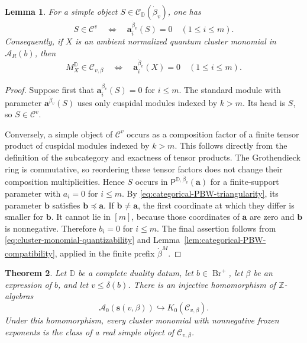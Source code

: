 \documentclass[12pt, reqno]{amsart}
\theoremstyle{plain}
\newtheorem{theorem}{Theorem}[section]
\newtheorem{lemma}[theorem]{Lemma}
\theoremstyle{definition}
\numberwithin{equation}{section}
\newcommand{\ZZ}{\mathbb{Z}}
\newcommand{\DD}{\mathbb{D}}
\newcommand{\bfa}{\mathbf{a}}
\newcommand{\cA}{\mathcal{A}}
\newcommand{\Br}{{\operatorname{Br}}}
\begin{document}
\begin{lemma}\label{lem:categorical-prefix-vanishing}
For a simple object \(S\in\mathscr C_{\DD}(\dot\beta_v)\), one has
\[
S\in\mathscr C^v
\quad\Longleftrightarrow\quad
\bfa^{\dot\beta_v}_i(S)=0\quad(1\le i\le m).
\]
Consequently, if \(X\) is an ambient normalized quantum cluster
monomial in \(\widehat{\cA}_R(b)\), then
\[
M_X^{\DD}\in\mathscr C_{v,\beta}
\quad\Longleftrightarrow\quad
\bfa^{\dot\beta_v}_i(X)=0\quad(1\le i\le m).
\]
\end{lemma}

\begin{proof}
Suppose first that \(\bfa^{\dot\beta_v}_i(S)=0\) for \(i\le m\).
The standard module with parameter \(\bfa^{\dot\beta_v}(S)\) uses
only cuspidal modules indexed by \(k>m\). Its head is \(S\), so
\(S\in\mathscr C^v\).

Conversely, a simple object of \(\mathscr C^v\) occurs as a
composition factor of a finite tensor product of cuspidal modules
indexed by \(k>m\). This follows directly from the definition of the
subcategory and exactness of tensor products. The Grothendieck ring
is commutative, so reordering these tensor factors does not change
their composition multiplicities. Hence \(S\) occurs in
\(\mathsf P^{\DD,\dot\beta_v}(\mathbf a)\) for a finite-support
parameter with \(a_i=0\) for \(i\le m\). By
\eqref{eq:categorical-PBW-triangularity}, its parameter \(\mathbf b\)
satisfies \(\mathbf b\preceq\mathbf a\). If \(\mathbf b\ne\mathbf a\),
the first coordinate at which they differ is smaller for
\(\mathbf b\). It cannot lie in \([m]\), because those coordinates of
\(\mathbf a\) are zero and \(\mathbf b\) is nonnegative. Therefore
\(b_i=0\) for \(i\le m\).
The final assertion follows from
\eqref{eq:cluster-monomial-quantizability} and
Lemma~\ref{lem:categorical-PBW-compatibility}, applied in the finite
prefix \(\dot\beta^M\).
\end{proof}

\begin{theorem}\label{thm:categorification}
Let \(\DD\) be a complete duality datum, let \(b\in\Br^+\), let
\(\beta\) be an expression of \(b\), and let \(v\le\delta(b)\).
There is an injective homomorphism of \(\ZZ\)-algebras
\[
\cA_0(\mathbf s(v,\beta))\hookrightarrow
K_0(\mathscr C_{v,\beta}).
\]
Under this homomorphism, every cluster monomial with nonnegative
frozen exponents is the class of a real simple object of
\(\mathscr C_{v,\beta}\).
\end{theorem}
\end{document}
